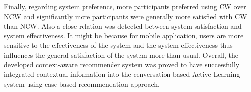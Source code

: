 Finally, regarding system preference, more participants preferred using CW over NCW and significantly more participants were generally more satisfied with CW than NCW. Also a close relation was detected between system satisfaction and system effectiveness. It might be because for mobile application, users are more sensitive to the effectiveness of the system and the system effectiveness thus influences the general satisfaction of the system more than usual. Overall, the developed context-aware recommender system was proved to have successfully integrated contextual information into the conversation-based Active Learning system using case-based recommendation approach. 

















































